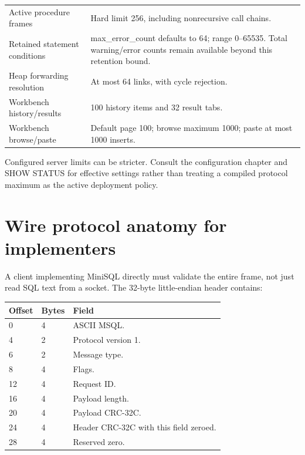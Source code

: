 \begin{longtable}{p{.4\linewidth}p{.49\linewidth}}
Active procedure frames & Hard limit 256, including nonrecursive call chains. \\
Retained statement conditions & max\_error\_count defaults to 64; range 0--65535. Total warning/error counts remain available beyond this retention bound. \\
Heap forwarding resolution & At most 64 links, with cycle rejection. \\
Workbench history/results & 100 history items and 32 result tabs. \\
Workbench browse/paste & Default page 100; browse maximum 1000; paste at most 1000 inserts. \\
\bottomrule
\end{longtable}

Configured server limits can be stricter. Consult the configuration chapter and SHOW STATUS for effective settings rather than treating a compiled protocol maximum as the active deployment policy.


\section{Wire protocol anatomy for implementers}

A client implementing MiniSQL directly must validate the entire frame, not just read SQL text from a socket. The 32-byte little-endian header contains:

\begin{longtable}{p{.12\linewidth}p{.12\linewidth}p{.65\linewidth}}
\toprule Offset & Bytes & Field \\\midrule
0 & 4 & ASCII MSQL. \\
4 & 2 & Protocol version 1. \\
6 & 2 & Message type. \\
8 & 4 & Flags. \\
12 & 4 & Request ID. \\
16 & 4 & Payload length. \\
20 & 4 & Payload CRC-32C. \\
24 & 4 & Header CRC-32C with this field zeroed. \\
28 & 4 & Reserved zero. \\
\bottomrule
\end{longtable}


